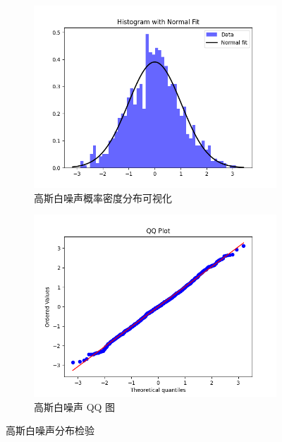 \begin{figure}[ht]
    \centering
    \begin{subfigure}[b]{0.48\textwidth}
        \centering
        \includegraphics[width=\textwidth]{static/gaussian_fit.png}
        \caption{
            高斯白噪声概率密度分布可视化
        }\label{fig:gaussian_fit}
    \end{subfigure}
    \hfill
    \begin{subfigure}[b]{0.48\textwidth}
        \centering
        \includegraphics[width=\textwidth]{static/gaussian_qq.png}
        \caption{
            高斯白噪声 QQ 图
        }\label{fig:gaussian_qq}
    \end{subfigure}
    \caption{
        高斯白噪声分布检验
    }\label{fig:gaussian_simulation}
\end{figure}

